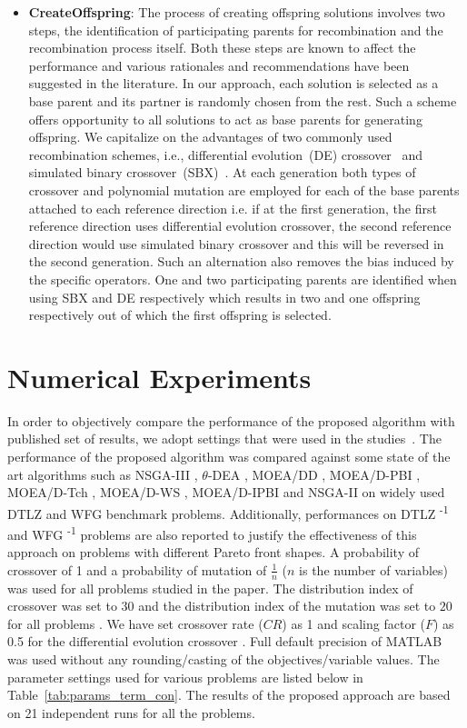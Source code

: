 \documentclass{sig-alternate}
\begin{document}
\begin{itemize}
	\item \textbf{CreateOffspring}: The process of creating offspring solutions involves two steps, the identification of participating parents for recombination and the recombination process itself. Both these steps are known to affect the performance and various rationales and recommendations have been suggested in the literature. In our approach, each solution is selected as a base parent and its partner is randomly chosen from the rest. Such a scheme offers opportunity to all solutions to act as base parents for generating offspring. We capitalize on the advantages of two commonly used recombination schemes, i.e., differential evolution~(DE) crossover~\cite{das2011de} and simulated binary crossover~(SBX)~\cite{deb2002fast}. At each generation both types of crossover and polynomial mutation are employed for each of the base parents attached to each reference direction i.e. if at the first generation, the first reference direction uses differential evolution crossover, the second reference direction would use simulated binary crossover and this will be reversed in the second generation. Such an alternation also removes the bias induced by the specific operators. One and two participating parents are identified when using SBX and DE respectively which results in two and one offspring respectively out of which the first offspring is selected.       
	
\end{itemize}

\section{Numerical Experiments}
\label{sec:expset}

In order to objectively compare the performance of the proposed algorithm with published set of results, we adopt settings that were used in the studies~\cite{Deb2014adaptive,ishibuchi2016inverse}. The performance of the proposed algorithm was compared against some state of the art algorithms such as NSGA-III \cite{Deb2014adaptive}, $\theta$-DEA \cite{}, MOEA/DD \cite{}, MOEA/D-PBI \cite{}, MOEA/D-Tch \cite{}, MOEA/D-WS \cite{}, MOEA/D-IPBI \cite{} and NSGA-II \cite{deb2002fast} on widely used DTLZ and WFG benchmark problems. Additionally, performances on DTLZ \textsuperscript{-1} and WFG \textsuperscript{-1} problems are also reported to justify the effectiveness of this approach on problems with different Pareto front shapes. A probability of crossover of 1 and a probability of mutation of $\frac{1}{n}$ ($n$ is the number of variables) \cite{Deb2014adaptive} was used for all problems studied in the paper. The distribution index of crossover was set to $30$ and the distribution index of the mutation was set to $20$ for all problems \cite{Deb2014adaptive}. We have set crossover rate ($CR$) as 1 and scaling factor ($F$) as 0.5 for the differential evolution crossover \cite{das2011de}. Full default precision of MATLAB was used without any rounding/casting of the objectives/variable values. The parameter settings used for various problems are listed below in Table~\ref{tab:params_term_con}. The results of the proposed approach are based on 21 independent runs for all the problems.  
\end{document}
